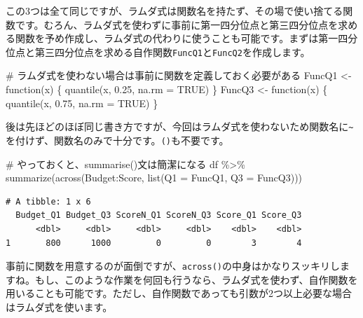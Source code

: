 \documentclass[
  a4paper,
  pandoc,
  ja=standard,
  jafont=haranoaji]{bxjsbook}
\newenvironment{Shaded}{\begin{snugshade}}{\end{snugshade}}
\newcommand{\AttributeTok}[1]{\textcolor[rgb]{0.00,0.48,0.65}{#1}}
\newcommand{\CommentTok}[1]{\textcolor[rgb]{0.37,0.37,0.37}{#1}}
\newcommand{\ConstantTok}[1]{\textcolor[rgb]{0.56,0.35,0.01}{#1}}
\newcommand{\ControlFlowTok}[1]{\textcolor[rgb]{0.00,0.48,0.65}{#1}}
\newcommand{\FloatTok}[1]{\textcolor[rgb]{0.68,0.00,0.00}{#1}}
\newcommand{\FunctionTok}[1]{\textcolor[rgb]{0.28,0.35,0.67}{#1}}
\newcommand{\NormalTok}[1]{\textcolor[rgb]{0.00,0.48,0.65}{#1}}
\newcommand{\OtherTok}[1]{\textcolor[rgb]{0.00,0.48,0.65}{#1}}
\newcommand{\SpecialCharTok}[1]{\textcolor[rgb]{0.37,0.37,0.37}{#1}}
\begin{document}
この3つは全て同じですが、ラムダ式は関数名を持たず、その場で使い捨てる関数です。むろん、ラムダ式を使わずに事前に第一四分位点と第三四分位点を求める関数を予め作成し、ラムダ式の代わりに使うことも可能です。まずは第一四分位点と第三四分位点を求める自作関数\texttt{FuncQ1}と\texttt{FuncQ2}を作成します。

\begin{Shaded}
\begin{Highlighting}[numbers=left,,]
\CommentTok{\# ラムダ式を使わない場合は事前に関数を定義しておく必要がある}
\NormalTok{FuncQ1 }\OtherTok{\textless{}{-}} \ControlFlowTok{function}\NormalTok{(x) \{}
  \FunctionTok{quantile}\NormalTok{(x, }\FloatTok{0.25}\NormalTok{, }\AttributeTok{na.rm =} \ConstantTok{TRUE}\NormalTok{)}
\NormalTok{\}}
\NormalTok{FuncQ3 }\OtherTok{\textless{}{-}} \ControlFlowTok{function}\NormalTok{(x) \{}
  \FunctionTok{quantile}\NormalTok{(x, }\FloatTok{0.75}\NormalTok{, }\AttributeTok{na.rm =} \ConstantTok{TRUE}\NormalTok{)}
\NormalTok{\}}
\end{Highlighting}
\end{Shaded}

後は先ほどのほぼ同じ書き方ですが、今回はラムダ式を使わないため関数名に\texttt{\textasciitilde{}}を付けず、関数名のみで十分です。\texttt{()}も不要です。

\begin{Shaded}
\begin{Highlighting}[numbers=left,,]
\CommentTok{\# やっておくと、summarise()文は簡潔になる}
\NormalTok{df }\SpecialCharTok{\%\textgreater{}\%}
  \FunctionTok{summarize}\NormalTok{(}\FunctionTok{across}\NormalTok{(Budget}\SpecialCharTok{:}\NormalTok{Score, }\FunctionTok{list}\NormalTok{(}\AttributeTok{Q1 =}\NormalTok{ FuncQ1, }\AttributeTok{Q3 =}\NormalTok{ FuncQ3)))}
\end{Highlighting}
\end{Shaded}

\begin{verbatim}
# A tibble: 1 x 6
  Budget_Q1 Budget_Q3 ScoreN_Q1 ScoreN_Q3 Score_Q1 Score_Q3
      <dbl>     <dbl>     <dbl>     <dbl>    <dbl>    <dbl>
1       800      1000         0         0        3        4
\end{verbatim}

事前に関数を用意するのが面倒ですが、\texttt{across()}の中身はかなりスッキリしますね。もし、このような作業を何回も行うなら、ラムダ式を使わず、自作関数を用いることも可能です。ただし、自作関数であっても引数が2つ以上必要な場合はラムダ式を使います。
\end{document}
